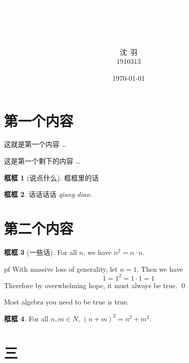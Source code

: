\documentclass{beamer}
\title{\textcolor{white}{这\ 是\ 标\ 题}}
\subtitle{\textcolor{white}{这\ 是\ 小\ 标\ 题\ 小\ 标\ 题}}
\author{沈\ 羽\\ 1910313}
\date{\today}
\theoremstyle{definition}
\newtheorem{框}{框框}[section]
\numberwithin{equation}{section}
\begin{document}
	
	
	\begin{frame}
		\titlepage
	\end{frame}
	
	
	
	\section{第一个内容}
	
	
	
	 
	\begin{frame}
		这就是第一个内容 \dots
	\end{frame}
	
	
	
	\begin{frame}
		这是第一个剩下的内容 \dots
		
		\begin{框}[说点什么]
			框框里的话
		\end{框}
		
		\begin{框}
			话话话话 \emph{qiang diao}.
		\end{框}
	\end{frame}
	
	
	
	\section{第二个内容}
	
	
	
	\begin{frame}
		\begin{框}[一些话]
			For all $n$, we have $n^2= n \cdot n$.
		\end{框}
		
		pf With massive loss of generality, let $n=1$. Then we have
		\[
		1=1^2= 1 \cdot 1= 1
		\]
		Therefore by overwhelming hope, it must always be true. \qed
	\end{frame}
	
	
	

	\begin{frame}
		Most algebra you need to be true is true.
		\begin{框}
			For all $n,m \in N$, $(n+m)^2= n^2 + m^2$.
		\end{框}
	\end{frame}
	
	
	
	\section{三}
	
\end{document}
